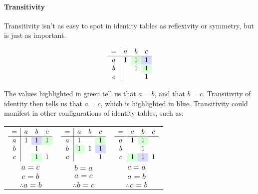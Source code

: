 \documentclass[PHIL101-Textbook.tex]{subfiles}
\begin{document}
\paragraph{Transitivity}

Transitivity isn't as easy to spot in identity tables as reflexivity or symmetry, but is just as important. 

\begin{center}
\[\begin{array}{c|ccc}
	= & a & b & c \\ \hline
	a & \vT & \cellcolor{green!15} \vT& \cellcolor{blue!15} \vT \\
	b &  & \vT & \cellcolor{green!15} \vT \\
	c &  &  & \vT \\
\end{array} \]
\end{center}

\noindent The values highlighted in green tell us that $a=b$, and that $b=c$. Transitivity of identity then tells us that $a=c$, which is highlighted in blue. Transitivity could manifest in other configurations of identity tables, such as:

\begin{center}
  \begin{tabular}{ccc}
	$\begin{array}{c|ccc}
	   = & a & b & c \\ \hline
	   a & \vT & \cellcolor{blue!15} \vT & \cellcolor{green!15} \vT \\
	   b &  & \vT & \\
	   c &  & \cellcolor{green!15} \vT & \vT \\
	 \end{array}$
	 &
   $\begin{array}{c|ccc}
	  = & a & b & c \\ \hline
	  a & \vT &  & \cellcolor{green!15} \vT \\
	  b & \cellcolor{green!15} \vT & \vT & \cellcolor{blue!15} \vT\\
	  c &  & & \vT \\
	\end{array}$
	 & 
   $\begin{array}{c|ccc}
	  = & a & b & c \\ \hline
	  a & \vT & \cellcolor{green!15} \vT &  \\
	  b & & \vT & \\
	  c & \cellcolor{green!15} \vT & \cellcolor{blue!15} \vT & \vT \\
	\end{array}$\\ 
	$a=c$ & $b=a$& $c=a$\\
	$c=b$ & $a=c$& $a=b$\\
	$\therefore a=b$ &$\therefore b=c$ & $\therefore c=b$
  \end{tabular}
\end{center}
\end{document}
